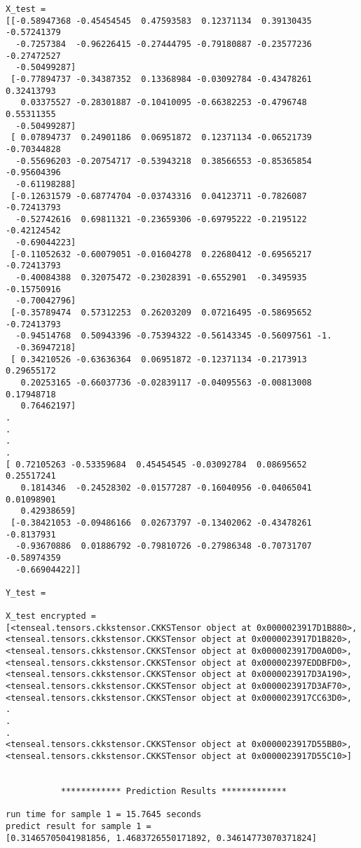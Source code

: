 \documentclass[11pt]{article}
\begin{document}
\begin{lstlisting}
X_test =  
[[-0.58947368 -0.45454545  0.47593583  0.12371134  0.39130435 -0.57241379
  -0.7257384  -0.96226415 -0.27444795 -0.79180887 -0.23577236 -0.27472527
  -0.50499287]
 [-0.77894737 -0.34387352  0.13368984 -0.03092784 -0.43478261  0.32413793
   0.03375527 -0.28301887 -0.10410095 -0.66382253 -0.4796748   0.55311355
  -0.50499287]
 [ 0.07894737  0.24901186  0.06951872  0.12371134 -0.06521739 -0.70344828
  -0.55696203 -0.20754717 -0.53943218  0.38566553 -0.85365854 -0.95604396
  -0.61198288]
 [-0.12631579 -0.68774704 -0.03743316  0.04123711 -0.7826087  -0.72413793
  -0.52742616  0.69811321 -0.23659306 -0.69795222 -0.2195122  -0.42124542
  -0.69044223]
 [-0.11052632 -0.60079051 -0.01604278  0.22680412 -0.69565217 -0.72413793
  -0.40084388  0.32075472 -0.23028391 -0.6552901  -0.3495935  -0.15750916
  -0.70042796]
 [-0.35789474  0.57312253  0.26203209  0.07216495 -0.58695652 -0.72413793
  -0.94514768  0.50943396 -0.75394322 -0.56143345 -0.56097561 -1.
  -0.36947218]
 [ 0.34210526 -0.63636364  0.06951872 -0.12371134 -0.2173913   0.29655172
   0.20253165 -0.66037736 -0.02839117 -0.04095563 -0.00813008  0.17948718
   0.76462197]
.
.
.
.
[ 0.72105263 -0.53359684  0.45454545 -0.03092784  0.08695652  0.25517241
   0.1814346  -0.24528302 -0.01577287 -0.16040956 -0.04065041  0.01098901
   0.42938659]
 [-0.38421053 -0.09486166  0.02673797 -0.13402062 -0.43478261 -0.8137931
  -0.93670886  0.01886792 -0.79810726 -0.27986348 -0.70731707 -0.58974359
  -0.66904422]]

Y_test =  

X_test encrypted = 
[<tenseal.tensors.ckkstensor.CKKSTensor object at 0x0000023917D1B880>,
<tenseal.tensors.ckkstensor.CKKSTensor object at 0x0000023917D1B820>,
<tenseal.tensors.ckkstensor.CKKSTensor object at 0x0000023917D0A0D0>,
<tenseal.tensors.ckkstensor.CKKSTensor object at 0x000002397EDDBFD0>,
<tenseal.tensors.ckkstensor.CKKSTensor object at 0x0000023917D3A190>,
<tenseal.tensors.ckkstensor.CKKSTensor object at 0x0000023917D3AF70>,
<tenseal.tensors.ckkstensor.CKKSTensor object at 0x0000023917CC63D0>,
.
.
.
<tenseal.tensors.ckkstensor.CKKSTensor object at 0x0000023917D55BB0>,
<tenseal.tensors.ckkstensor.CKKSTensor object at 0x0000023917D55C10>]


           ************ Prediction Results *************
           
run time for sample 1 = 15.7645 seconds
predict result for sample 1 =
[0.31465705041981856, 1.4683726550171892, 0.34614773070371824]


\end{lstlisting}
\end{document}
